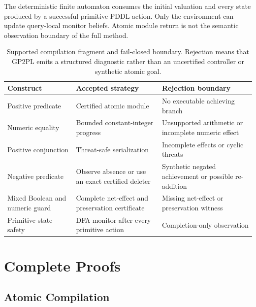 \begin{assumption}
The deterministic finite automaton consumes the initial valuation and every
state produced by a successful primitive PDDL action. Only the environment can
update query-local monitor beliefs. Atomic module return is not the semantic
observation boundary of the full method.
\end{assumption}

\begin{table}[htbp]
\centering
\small
\setlength{\tabcolsep}{2pt}
\begin{tabular}{@{}
>{\raggedright\arraybackslash}p{}
>{\raggedright\arraybackslash}p{}
>{\raggedright\arraybackslash}p{}@{}}
\toprule
Construct & Accepted strategy & Rejection boundary \\
\midrule
Positive predicate & Certified atomic module & No executable achieving branch \\
Numeric equality & Bounded constant-integer progress & Unsupported arithmetic or
incomplete numeric effect \\
Positive conjunction & Threat-safe serialization & Incomplete effects or cyclic
threats \\
Negative predicate & Observe absence or use an exact certified deleter & Synthetic
negated achievement or possible re-addition \\
Mixed Boolean and numeric guard & Complete net-effect and preservation certificate &
Missing net-effect or preservation witness \\
Primitive-state safety & DFA monitor after every primitive action & Completion-only
observation \\
\bottomrule
\end{tabular}
\caption{Supported compilation fragment and fail-closed boundary. Rejection
means that GP2PL emits a structured diagnostic rather than an uncertified
controller or synthetic atomic goal.}
\label{tab:supported-fragment}
\end{table}

\section{Complete Proofs}
\label{app:proofs}

\subsection{Atomic Compilation}

